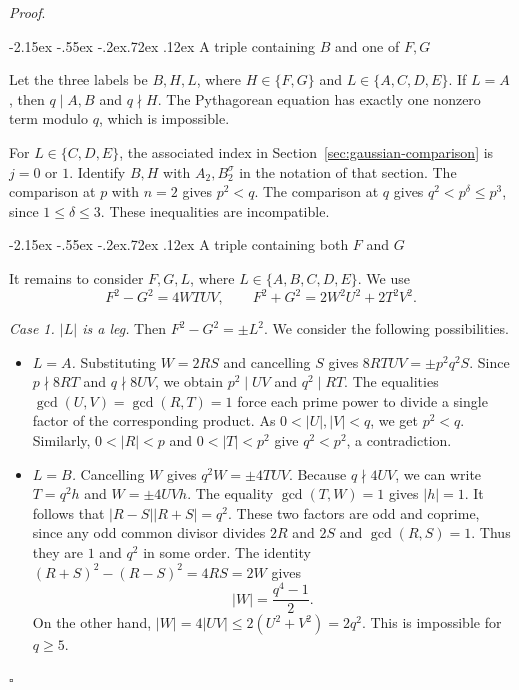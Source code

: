 \documentclass[11pt,a4paper,twoside]{article}
\makeatletter
\numberwithin{equation}{section}
\newcommand{\proseheadingstop}{.}
\providecommand{\proofname}{Proof}
\renewcommand{\subsection}{\@startsection{subsection}{2}{\z@}%
  {-2.15ex \@plus -.55ex \@minus -.2ex}{.72ex \@plus .12ex}%
  {\normalfont\normalsize\bfseries}}
\newenvironment{proof}[1][\proofname]{%
  \par\addvspace{.65\baselineskip}\noindent
  \textit{#1}\proseheadingstop\enspace\ignorespaces
}{%
  \unskip\nobreak\hfill\nobreak\(\square\)\par
  \addvspace{.65\baselineskip}
}
\makeatother
\begin{document}
\begin{proof}
\subsection{A triple containing \texorpdfstring{\(B\)}{B} and one of \texorpdfstring{\(F,G\)}{F,G}}

Let the three labels be \(B,H,L\), where \(H\in\{F,G\}\) and
\(L\in\{A,C,D,E\}\). If \(L=A\), then \(q\mid A,B\) and \(q\nmid H\).
The Pythagorean equation has exactly one nonzero term modulo \(q\),
which is impossible.

For \(L\in\{C,D,E\}\), the associated index in Section~\ref{sec:gaussian-comparison} is \(j=0\)
or \(1\). Identify \(B,H\) with \(A_2,B_2^\sigma\) in the notation of
that section. The comparison at \(p\) with \(n=2\) gives \(p^2<q\).
The comparison at \(q\) gives \(q^2<p^\delta\le p^3\), since
\(1\le\delta\le3\). These inequalities are incompatible.

\subsection{A triple containing both \texorpdfstring{\(F\)}{F} and \texorpdfstring{\(G\)}{G}}

It remains to consider \(F,G,L\), where \(L\in\{A,B,C,D,E\}\).
We use
\[
F^2-G^2=4WTUV,\qquad F^2+G^2=2W^2U^2+2T^2V^2.
\]

\smallskip
\noindent\textit{Case 1. \(\lvert L\rvert\) is a leg.}
Then \(F^2-G^2=\pm L^2\). We consider the following possibilities.

\begin{itemize}
\item \textit{\(L=A\).} Substituting \(W=2RS\) and cancelling \(S\)
gives \(8RTUV=\pm p^2q^2S\). Since \(p\nmid8RT\) and \(q\nmid8UV\),
we obtain \(p^2\mid UV\) and \(q^2\mid RT\). The equalities
\(\gcd(U,V)=\gcd(R,T)=1\) force each prime power to divide a single
factor of the corresponding product. As \(0<|U|,|V|<q\), we get
\(p^2<q\). Similarly, \(0<|R|<p\) and \(0<|T|<p^2\) give
\(q^2<p^2\), a contradiction.

\item \textit{\(L=B\).} Cancelling \(W\) gives \(q^2W=\pm4TUV\).
Because \(q\nmid4UV\), we can write \(T=q^2h\) and \(W=\pm4UVh\).
The equality \(\gcd(T,W)=1\) gives \(|h|=1\). It follows that
\(\lvert R-S\rvert\lvert R+S\rvert=q^2\). These two factors are odd
and coprime, since any odd common divisor divides \(2R\) and \(2S\)
and \(\gcd(R,S)=1\). Thus they are \(1\) and \(q^2\) in some order.
The identity \((R+S)^2-(R-S)^2=4RS=2W\) gives
\[
|W|=\frac{q^4-1}{2}.
\]
On the other hand, \(|W|=4|UV|\le 2(U^2+V^2)=2q^2\).
This is impossible for \(q\ge5\).


\end{itemize}
\end{proof}
\end{document}
